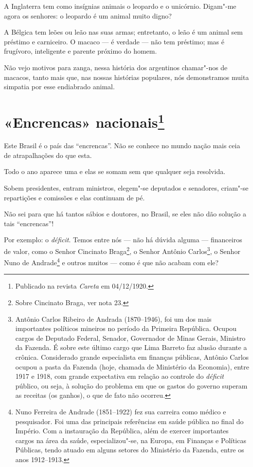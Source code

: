 A Inglaterra tem como insígnias animais o leopardo e o unicórnio.
Digam"-me agora os senhores: o leopardo é um animal muito digno?

A Bélgica tem leões ou leão nas suas armas; entretanto, o leão é um
animal sem préstimo e carniceiro. O macaco --- é verdade --- não tem
préstimo; mas é frugívoro, inteligente e parente próximo do homem.

Não vejo motivos para zanga, nessa história dos argentinos chamar"-nos de
macacos, tanto mais que, nas nossas histórias populares, nós
demonstramos muita simpatia por esse endiabrado animal.




\chapter[«Encrencas» nacionais]{«Encrencas» nacionais\footnote[*]{Publicado na revista \emph{Careta} em 04/12/1920.}}

Este Brasil é o país das ``encrencas''. Não se conhece no mundo nação
mais ceia de atrapalhações do que esta.

Todo o ano aparece uma e elas se somam sem que qualquer seja resolvida.

Sobem presidentes, entram ministros, elegem"-se deputados e senadores,
criam"-se repartições e comissões e elas continuam de pé.

Não sei para que há tantos sábios e doutores, no Brasil, se eles não dão
solução a tais ``encrencas''!

Por exemplo: o \emph{déficit}. Temos entre nós --- não há dúvida alguma
--- financeiros de valor, como o Senhor Cincinato Braga\footnote{Sobre
  Cincinato Braga, ver nota 23.}, o Senhor Antônio Carlos\footnote{Antônio
  Carlos Ribeiro de Andrada (1870--1946), foi um dos mais importantes
  políticos mineiros no período da Primeira República. Ocupou cargos de
  Deputado Federal, Senador, Governador de Minas Gerais, Ministro da
  Fazenda. É sobre este último cargo que Lima Barreto faz alusão durante
  a crônica. Considerado grande especialista em finanças públicas,
  Antônio Carlos ocupou a pasta da Fazenda (hoje, chamada de Ministério
  da Economia), entre 1917 e 1918, com grande expectativa em relação ao
  controle do \emph{déficit} público, ou seja, à solução do problema em
  que os gastos do governo superam as receitas (os ganhos), o que de
  fato não ocorreu.}, o Senhor Nuno de Andrade\footnote{Nuno Ferreira de
  Andrade (1851--1922) fez sua carreira como médico e pesquisador. Foi
  uma das principais referências em saúde pública no final do Império.
  Com a instauração da República, além de exercer importantes cargos na
  área da saúde, especializou"-se, na Europa, em Finanças e Políticas
  Públicas, tendo atuado em alguns setores do Ministério da Fazenda,
  entre os anos 1912--1913.} e outros muitos --- como é que não acabam
com ele?

